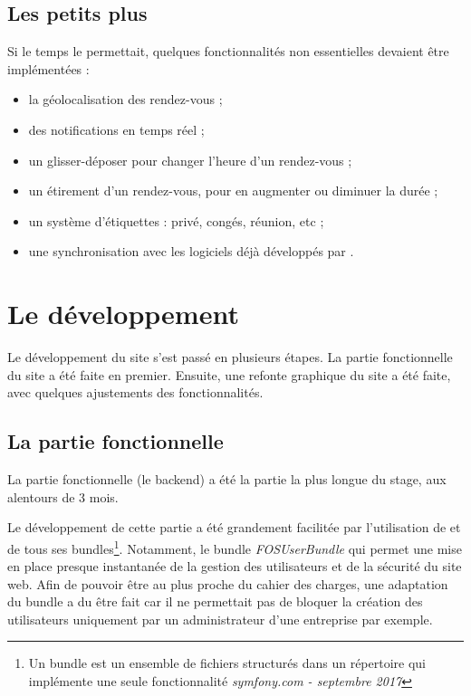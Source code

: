 \documentclass[a4paper, 11pt]{report}
\begin{document}
    \subsection{Les petits plus}
    Si le temps le permettait, quelques fonctionnalités non essentielles devaient être implémentées :
    \begin{itemize}
        \item la géolocalisation des rendez-vous ;
        \item des notifications en temps réel ;
        \item un glisser-déposer pour changer l'heure d'un rendez-vous ;
        \item un étirement d'un rendez-vous, pour en augmenter ou diminuer la durée ;
        \item un système d'étiquettes : privé, congés, réunion, etc ;
        \item une synchronisation avec les logiciels déjà développés par \logilink.
    \end{itemize}

\section{Le développement}
Le développement du site \agenda s'est passé en plusieurs étapes. La partie fonctionnelle du site a été faite en premier. Ensuite, une refonte graphique du site a été faite, avec quelques ajustements des fonctionnalités.
    \subsection{La partie fonctionnelle}
    La partie fonctionnelle (le backend) a été la partie la plus longue du stage, aux alentours de 3 mois.

    Le développement de cette partie a été grandement facilitée par l'utilisation de \symfony et de tous ses bundles\footnote{Un bundle est un ensemble de fichiers structurés dans un répertoire qui implémente une seule fonctionnalité \textit{symfony.com - septembre 2017}}. Notamment, le bundle \textit{FOSUserBundle} qui permet une mise en place presque instantanée de la gestion des utilisateurs et de la sécurité du site web. Afin de pouvoir être au plus proche du cahier des charges, une adaptation du bundle a du être fait car il ne permettait pas de bloquer la création des utilisateurs uniquement par un administrateur d'une entreprise par exemple.
\end{document}

